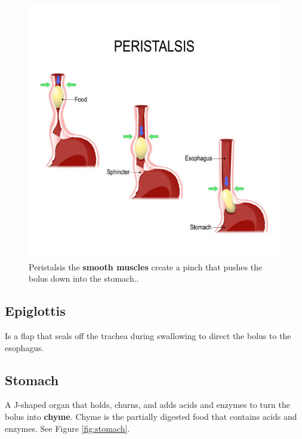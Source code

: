 \documentclass[12pt]{report}
\begin{document}
\begin{figure}[H]
\centering
    \includegraphics[width=\textwidth]{../figures/esophagus bolus.jpg}
    \caption{Peristalsis the \textbf{smooth muscles} create a pinch that pushes the bolus down into the stomach..}
    \label{esophagus-bolus}
\end{figure}

\subsection{Epiglottis}
\begin{definition}[Epiglottis]
    Is a flap that seals off the trachea during swallowing to direct the bolus to the esophagus.
\end{definition}

\subsection{Stomach}
\begin{definition}[Stomach]
    A J-shaped organ that holds, churns, and adds acids and enzymes to turn the bolus into \textbf{chyme}. Chyme is the partially digested food that contains acids and enzymes. See Figure \ref{fig:stomach}.
\end{definition}
\end{document}

